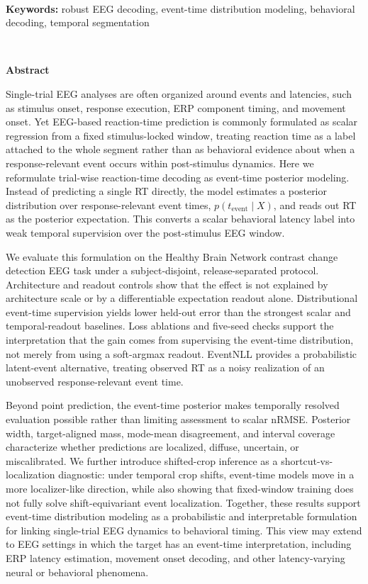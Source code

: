 \documentclass[12pt]{article}
\begin{document}
\ \\[-2mm]
{\bf Keywords:} robust EEG decoding, event-time distribution modeling, behavioral decoding, temporal segmentation

\thispagestyle{empty}
%
\ \vspace{-0mm}\\
%
\begin{center} {\bf Abstract} \end{center}



Single-trial EEG analyses are often organized around events and latencies, such as stimulus onset, response execution, ERP component timing, and movement onset. Yet EEG-based reaction-time prediction is commonly formulated as scalar regression from a fixed stimulus-locked window, treating reaction time as a label attached to the whole segment rather than as behavioral evidence about when a response-relevant event occurs within post-stimulus dynamics. Here we reformulate trial-wise reaction-time decoding as event-time posterior modeling. Instead of predicting a single RT directly, the model estimates a posterior distribution over response-relevant event times, \(p(t_{\mathrm{event}} \mid X)\), and reads out RT as the posterior expectation. This converts a scalar behavioral latency label into weak temporal supervision over the post-stimulus EEG window.

We evaluate this formulation on the Healthy Brain Network contrast change detection EEG task under a subject-disjoint, release-separated protocol. Architecture and readout controls show that the effect is not explained by architecture scale or by a differentiable expectation readout alone. Distributional event-time supervision yields lower held-out error than the strongest scalar and temporal-readout baselines. Loss ablations and five-seed checks support the interpretation that the gain comes from supervising the event-time distribution, not merely from using a soft-argmax readout. EventNLL provides a probabilistic latent-event alternative, treating observed RT as a noisy realization of an unobserved response-relevant event time.

Beyond point prediction, the event-time posterior makes temporally resolved evaluation possible rather than limiting assessment to scalar nRMSE. Posterior width, target-aligned mass, mode-mean disagreement, and interval coverage characterize whether predictions are localized, diffuse, uncertain, or miscalibrated. We further introduce shifted-crop inference as a shortcut-vs-localization diagnostic: under temporal crop shifts, event-time models move in a more localizer-like direction, while also showing that fixed-window training does not fully solve shift-equivariant event localization. Together, these results support event-time distribution modeling as a probabilistic and interpretable formulation for linking single-trial EEG dynamics to behavioral timing. This view may extend to EEG settings in which the target has an event-time interpretation, including ERP latency estimation, movement onset decoding, and other latency-varying neural or behavioral phenomena.
\end{document}
